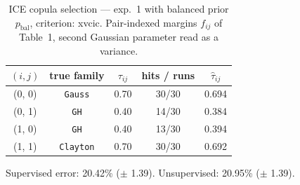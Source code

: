 \begin{table}[htbp]
  \centering
  \caption{ICE copula selection — exp.\ 1 with balanced prior $p_{\text{bal}}$, criterion: xvcic. Pair-indexed margins $f_{ij}$ of Table~1, second Gaussian parameter read as a variance.}
  \label{tab:exp3-exp1_bal_p__xvcic}
  \begin{tabular}{ccccc}
    \toprule
    $(i, j)$ & true family & $\tau_{ij}$ & hits / runs & $\hat\tau_{ij}$ \\
    \midrule
    (0, 0) & \texttt{Gauss} & 0.70 & 30/30 & 0.694 \\
    (0, 1) & \texttt{GH} & 0.40 & 14/30 & 0.384 \\
    (1, 0) & \texttt{GH} & 0.40 & 13/30 & 0.394 \\
    (1, 1) & \texttt{Clayton} & 0.70 & 30/30 & 0.692 \\
    \bottomrule
  \end{tabular}
  \par\smallskip Supervised error: 20.42\% ($\pm$ 1.39). Unsupervised: 20.95\% ($\pm$ 1.39).
\end{table}
